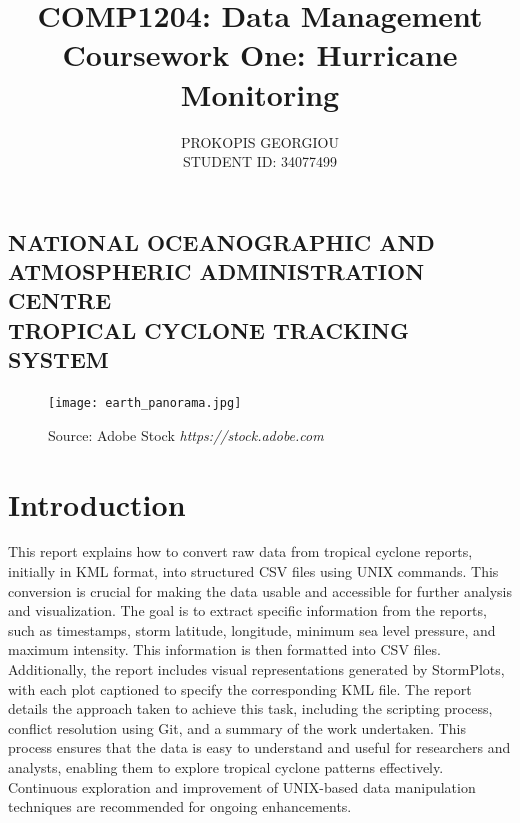 \documentclass[]{article}
\begin{document}
\title{COMP1204: Data Management \\ Coursework One: Hurricane Monitoring }
\author{PROKOPIS GEORGIOU\\STUDENT ID: 34077499}
\date{}
\maketitle
\begin{center}
   \section*{NATIONAL OCEANOGRAPHIC AND ATMOSPHERIC ADMINISTRATION CENTRE\\TROPICAL CYCLONE TRACKING SYSTEM} 
\end{center}
\vspace{2cm}
\begin{figure}[h]
  \centering
  \texttt{[image: earth\_panorama.jpg]}
  \caption*{\small{Source: Adobe Stock \textit{https://stock.adobe.com}}}
\end{figure}

\section{Introduction}
This report explains how to convert raw data from tropical cyclone reports, initially in KML format, into structured CSV files using UNIX commands. This conversion is crucial for making the data usable and accessible for further analysis and visualization. The goal is to extract specific information from the reports, such as timestamps, storm latitude, longitude, minimum sea level pressure, and maximum intensity. This information is then formatted into CSV files. Additionally, the report includes visual representations generated by StormPlots, with each plot captioned to specify the corresponding KML file. The report details the approach taken to achieve this task, including the scripting process, conflict resolution using Git, and a summary of the work undertaken. This process ensures that the data is easy to understand and useful for researchers and analysts, enabling them to explore tropical cyclone patterns effectively. Continuous exploration and improvement of UNIX-based data manipulation techniques are recommended for ongoing enhancements.

\clearpage
\end{document}
